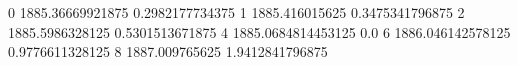 0 1885.36669921875 0.2982177734375
1 1885.416015625 0.3475341796875
2 1885.5986328125 0.5301513671875
4 1885.0684814453125 0.0
6 1886.046142578125 0.9776611328125
8 1887.009765625 1.9412841796875
